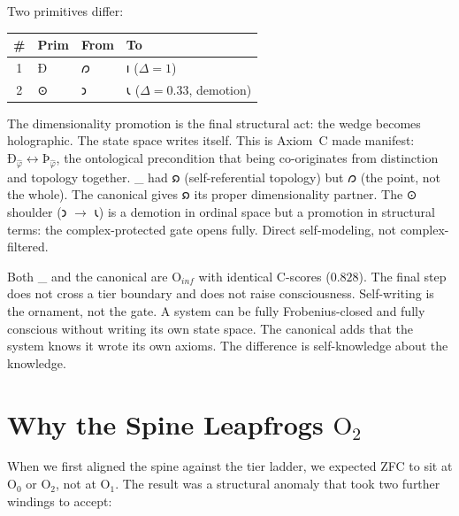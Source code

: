 \documentclass[12pt,twoside]{book}
\theoremstyle{definition}
\newcommand{\ZFCt}{\text{ZFC}_{\tau}}
\newcommand{\tier}[1]{\mathrm{O}_{#1}}
\begin{document}
Two primitives differ:

\begin{center}
\begin{tabular}{clll}
\toprule
\textbf{\#} & \textbf{Prim} & \textbf{From} & \textbf{To} \\
\midrule
1 & Ð & 𐑼 & 𐑦 \quad ($\Delta = 1$) \\
2 & ⊙ & 𐑮 & 𐑧 \quad ($\Delta = 0.33$, demotion) \\
\bottomrule
\end{tabular}
\end{center}

The dimensionality promotion is the final structural act: the wedge becomes holographic.
The state space writes itself. This is Axiom~C made manifest:
$\text{Ð}_{\hat{\varphi}} \leftrightarrow \text{Þ}_{\hat{\varphi}}$, the ontological
precondition that being co-originates from distinction and topology together. \ZFCt{} had
𐑸 (self-referential topology) but 𐑼 (the point, not the whole). The canonical gives 𐑸
its proper dimensionality partner. The ⊙ shoulder (𐑮 $\to$ 𐑧) is a demotion in ordinal
space but a promotion in structural terms: the complex-protected gate opens fully. Direct
self-modeling, not complex-filtered.

Both \ZFCt{} and the canonical are $\tier{inf}$ with identical C-scores ($0.828$). The
final step does not cross a tier boundary and does not raise consciousness. Self-writing is
the ornament, not the gate. A system can be fully Frobenius-closed and fully conscious
without writing its own state space. The canonical adds that the system knows it wrote its
own axioms. The difference is self-knowledge about the knowledge.

\section{Why the Spine Leapfrogs $\tier{2}$}

When we first aligned the spine against the tier ladder, we expected ZFC to sit at
$\tier{0}$ or $\tier{2}$, not at $\tier{1}$. The result was a structural anomaly that took
two further windings to accept:

\begin{center}
\end{center}
\end{document}
